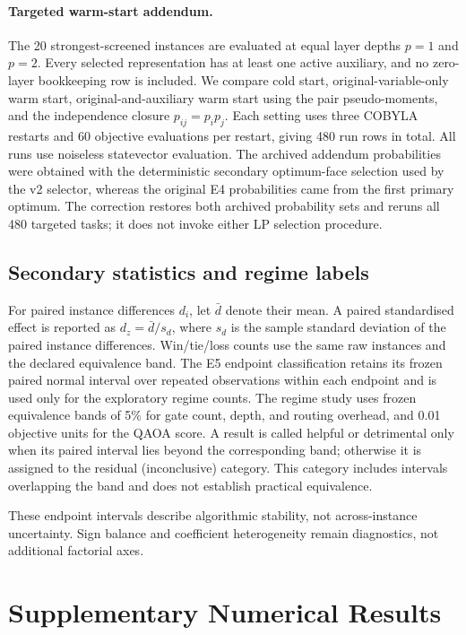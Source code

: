 \documentclass[a4paper,onecolumn,11pt,unpublished]{quantumarticle}
\theoremstyle{remark}
\begin{document}
\paragraph{Targeted warm-start addendum.}
The 20 strongest-screened instances are evaluated at equal layer depths
$p=1$ and $p=2$.  Every selected representation has at least one active
auxiliary, and no zero-layer bookkeeping row is included.  We compare cold
start, original-variable-only warm start, original-and-auxiliary warm start
using the pair pseudo-moments, and the independence closure
$p_{ij}=p_i p_j$.  Each setting uses three COBYLA restarts and 60 objective
evaluations per restart, giving 480 run rows in total.  All runs use noiseless
statevector evaluation. The archived addendum probabilities were obtained
with the deterministic secondary optimum-face selection used by the v2
selector, whereas the original E4 probabilities came from the first primary
optimum. The correction restores both archived probability sets and reruns
all 480 targeted tasks; it does not invoke either LP selection procedure.


\subsection{Secondary statistics and regime labels}
\label{app:experimental-statistics}

For paired instance differences $d_i$, let $\bar d$ denote their mean.
A paired standardised effect is reported as
$d_z=\bar d/s_d$, where $s_d$ is the sample standard deviation of the paired
instance differences.  Win/tie/loss counts use the same raw instances and the
declared equivalence band.  The E5 endpoint classification retains its frozen
paired normal interval over repeated observations within each endpoint and is used only for the
exploratory regime counts.  The regime study uses frozen
equivalence bands of 5\% for gate count, depth, and routing overhead, and 0.01
objective units for the QAOA score.  A result is called helpful or detrimental
only when its paired interval lies beyond the corresponding band; otherwise it
is assigned to the residual (inconclusive) category. This category includes
intervals overlapping the band and does not establish practical equivalence.

These endpoint intervals describe algorithmic stability, not across-instance
uncertainty. Sign balance and coefficient heterogeneity remain diagnostics,
not additional factorial axes.


\FloatBarrier
\section{Supplementary Numerical Results}
\label{app:supplementary-results}
\end{document}
